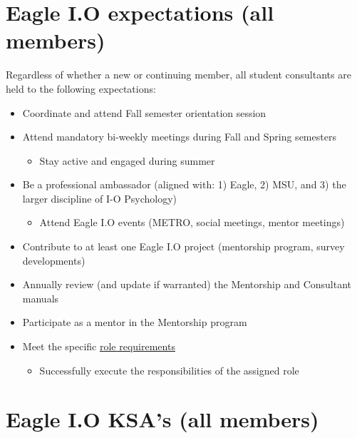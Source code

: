 \documentclass[
]{book}
\providecommand{\tightlist}{%
  \setlength{\itemsep}{0pt}\setlength{\parskip}{0pt}}
\begin{document}
\hypertarget{eagle-i.o-expectations-all-members}{%
\section{Eagle I.O expectations (all members)}\label{eagle-i.o-expectations-all-members}}

Regardless of whether a new or continuing member, all student consultants are held to the following expectations:

\begin{itemize}
\tightlist
\item
  Coordinate and attend Fall semester orientation session
\item
  Attend mandatory bi-weekly meetings during Fall and Spring semesters

  \begin{itemize}
  \tightlist
  \item
    Stay active and engaged during summer
  \end{itemize}
\item
  Be a professional ambassador (aligned with: 1) Eagle, 2) MSU, and 3) the larger discipline of I-O Psychology)

  \begin{itemize}
  \tightlist
  \item
    Attend Eagle I.O events (METRO, social meetings, mentor meetings)
  \end{itemize}
\item
  Contribute to at least one Eagle I.O project (mentorship program, survey developments)
\item
  Annually review (and update if warranted) the Mentorship and Consultant manuals
\item
  Participate as a mentor in the Mentorship program
\item
  Meet the specific \protect\hyperlink{roles}{role requirements}

  \begin{itemize}
  \tightlist
  \item
    Successfully execute the responsibilities of the assigned role
  \end{itemize}
\end{itemize}

\hypertarget{eagle-i.o-ksas-all-members}{%
\section{Eagle I.O KSA's (all members)}\label{eagle-i.o-ksas-all-members}}
\end{document}
